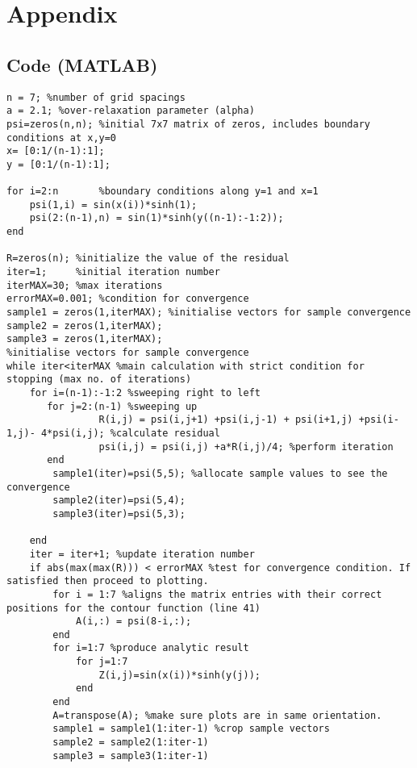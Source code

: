 \documentclass[a4paper,11pt]{article}
\begin{document}
\section{Appendix}
\subsection{Code (MATLAB)}
\begin{lstlisting}[style=matlab-editor]
n = 7; %number of grid spacings
a = 2.1; %over-relaxation parameter (alpha)
psi=zeros(n,n); %initial 7x7 matrix of zeros, includes boundary conditions at x,y=0
x= [0:1/(n-1):1];
y = [0:1/(n-1):1];

for i=2:n       %boundary conditions along y=1 and x=1
    psi(1,i) = sin(x(i))*sinh(1);
    psi(2:(n-1),n) = sin(1)*sinh(y((n-1):-1:2));
end

R=zeros(n); %initialize the value of the residual
iter=1;     %initial iteration number
iterMAX=30; %max iterations
errorMAX=0.001; %condition for convergence
sample1 = zeros(1,iterMAX); %initialise vectors for sample convergence
sample2 = zeros(1,iterMAX);
sample3 = zeros(1,iterMAX);
%initialise vectors for sample convergence
while iter<iterMAX %main calculation with strict condition for stopping (max no. of iterations)
    for i=(n-1):-1:2 %sweeping right to left
       for j=2:(n-1) %sweeping up
                R(i,j) = psi(i,j+1) +psi(i,j-1) + psi(i+1,j) +psi(i-1,j)- 4*psi(i,j); %calculate residual
                psi(i,j) = psi(i,j) +a*R(i,j)/4; %perform iteration
       end
        sample1(iter)=psi(5,5); %allocate sample values to see the convergence
        sample2(iter)=psi(5,4);
        sample3(iter)=psi(5,3);
       
    end
    iter = iter+1; %update iteration number
    if abs(max(max(R))) < errorMAX %test for convergence condition. If satisfied then proceed to plotting.
        for i = 1:7 %aligns the matrix entries with their correct positions for the contour function (line 41)
            A(i,:) = psi(8-i,:); 
        end
        for i=1:7 %produce analytic result
            for j=1:7
                Z(i,j)=sin(x(i))*sinh(y(j));
            end
        end
        A=transpose(A); %make sure plots are in same orientation.
        sample1 = sample1(1:iter-1) %crop sample vectors
        sample2 = sample2(1:iter-1)
        sample3 = sample3(1:iter-1)


\end{lstlisting}
\end{document}
